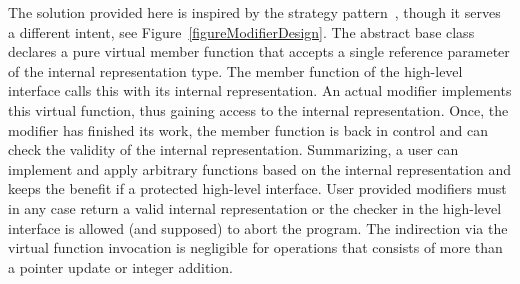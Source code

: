 The solution provided here is inspired by the strategy
pattern~\cite{ghjv-dpero-95}, though it serves a different intent, see
Figure~\ref{figureModifierDesign}.  The abstract base class
 declares a pure virtual member function
 that accepts a single reference parameter of the
internal representation type. The member function  of
the high-level interface calls this  with its internal
representation.  An actual modifier implements this virtual function,
thus gaining access to the internal representation. Once, the modifier
has finished its work, the member function  is back in
control and can check the validity of the internal representation.
Summarizing, a user can implement and apply arbitrary functions based
on the internal representation and keeps the benefit if a protected
high-level interface. User provided modifiers must in any case return
a valid internal representation or the checker in the high-level
interface is allowed (and supposed) to abort the program. The
indirection via the virtual function invocation is negligible for
operations that consists of more than a pointer update or integer
addition.


